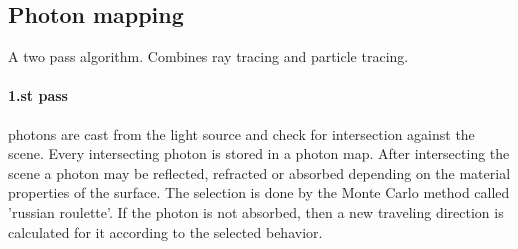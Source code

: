 	\subsection{Photon mapping} A two pass algorithm. Combines ray tracing and particle tracing.
	\paragraph{1.st pass} photons are cast from the light source and check for intersection against the scene.    Every intersecting photon is stored in a photon map. After intersecting the scene a photon may be reflected, refracted or absorbed depending on the material properties of the surface. The selection is done by the Monte Carlo method called 'russian roulette'. If the photon is not absorbed, then a new traveling direction is calculated for it according to the selected behavior.

